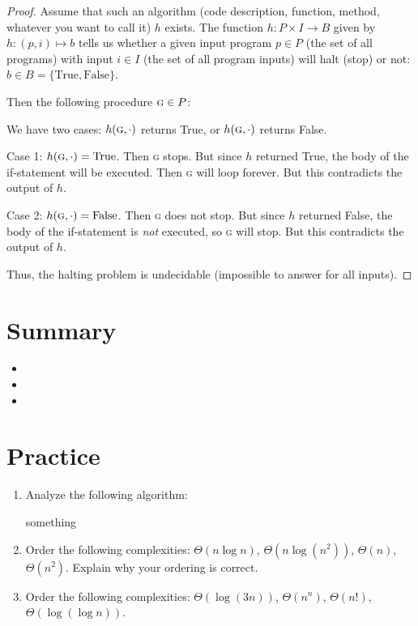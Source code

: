 \documentclass[main.tex]{subfiles}
\begin{document}
\begin{proof}
	Assume that such an algorithm (code description, function, method, whatever you want to call it) \(h\) exists. The function \(h : P \times I \rightarrow B\) given by \(h : (p,i) \mapsto b\) tells us whether a given input program \(p \in P\) (the set of all programs) with input \(i \in I\) (the set of all program inputs) will halt (stop) or not: \(b \in B = \{\text{True}, \text{False}\}\).
	
	Then the following procedure \(\textsc{g} \in P\):
	\begin{algorithmic}[1]
				\EndWhile
			\EndIf
		\EndFunction
	\end{algorithmic}
	
	We have two cases: \(h(\textsc{g},\cdot)\) returns True, or \(h(\textsc{g},\cdot)\) returns False.
	
	Case 1: \(h(\textsc{g},\cdot) = \text{True}\). Then \textsc{g} stops. But since \(h\) returned True, the body of the if-statement will be executed. Then \textsc{g} will loop forever. But this contradicts the output of \(h\).
	
	Case 2: \(h(\textsc{g},\cdot) = \text{False}\). Then \textsc{g} does not stop. But since \(h\) returned False, the body of the if-statement is \textit{not} executed, so \textsc{g} will stop. But this contradicts the output of \(h\).
	
	Thus, the halting problem is undecidable (impossible to answer for all inputs).
\end{proof}


\section{Summary}

\begin{itemize}
	\item 
	\item 
	\item 
\end{itemize}

\section{Practice}

\begin{enumerate}
	\item Analyze the following algorithm:
	\begin{algorithmic}[1]
			\State something
		\EndFunction
	\end{algorithmic}
	\item Order the following complexities: \(\Theta(n \log n)\), \(\Theta(n \log (n^2))\), \(\Theta(n)\), \(\Theta(n^2)\). Explain why your ordering is correct.
	\item Order the following complexities: \(\Theta(\log (3n))\), \(\Theta(n^n)\), \(\Theta(n!)\), \(\Theta(\log (\log n))\).
\end{enumerate}
\end{document}
